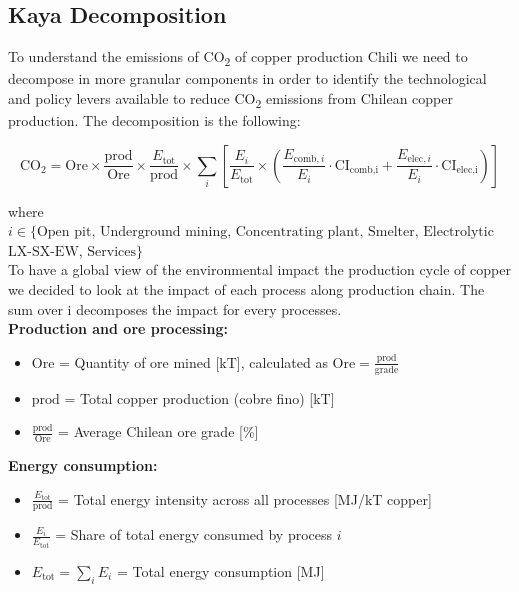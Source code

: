 \subsection{Kaya Decomposition}

To understand the emissions of CO\textsubscript{2} of copper production Chili we need to decompose in more granular components in order to identify the technological and policy levers available to reduce CO\textsubscript{2} emissions from Chilean copper production. The decomposition is the following: 

\begin{equation}
\text{CO}_2 = \text{Ore} \times \frac{\text{prod}}{\text{Ore}} \times \frac{E_{\text{tot}}}{\text{prod}} \times \sum_{i} \left[ \frac{E_i}{E_{\text{tot}}} \times \left( \frac{E_{\text{comb},i}}{E_i} \cdot \text{CI}_{\text{comb,i}} + \frac{E_{\text{elec},i}}{E_i} \cdot \text{CI}_{\text{elec,i}} \right) \right]
\end{equation}

where $i \in \{\text{Open pit, Underground mining, Concentrating plant, Smelter, Electrolytic refining,}$\\
$\text{LX-SX-EW, Services}\}$
\\
To have a global view of the environmental impact the production cycle of copper we decided to look at the impact of each process along production chain. The sum over i decomposes the impact for every processes.
\\
\textbf{Production and ore processing:}
\begin{itemize}
    \item $\text{Ore}$ = Quantity of ore mined [kT], calculated as $\text{Ore} = \frac{\text{prod}}{\text{grade}}$
    \item $\text{prod}$ = Total copper production (cobre fino) [kT]
    \item $\frac{\text{prod}}{\text{Ore}}$ = Average Chilean ore grade [\%]
\end{itemize}

\textbf{Energy consumption:}
\begin{itemize}
    \item $\frac{E_{\text{tot}}}{\text{prod}}$ = Total energy intensity across all processes [MJ/kT copper]
    \item $\frac{E_i}{E_{\text{tot}}}$ = Share of total energy consumed by process $i$
    \item $E_{\text{tot}} = \sum_{i} E_i$ = Total energy consumption [MJ]
\end{itemize}

